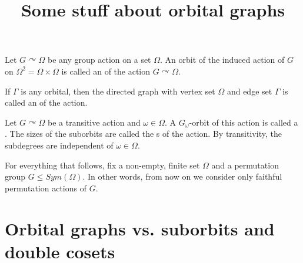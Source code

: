 \documentclass[fontsize=11pt,fleqn,a4paper]{scrartcl}
\title{Some stuff about orbital graphs}
\begin{document}
\maketitle

\begin{definition}
Let $G\curvearrowright\Omega$ be any group action on a set $\Omega$. An orbit of the induced action of $G$ on $\Omega^2=\Omega\times\Omega$ is called an  of the action $G \curvearrowright \Omega$.

If $\Gamma$ is any orbital, then the directed graph with vertex set $\Omega$ and edge set $\Gamma$ is called an  of the action.
\end{definition}

\begin{definition}
Let $G\curvearrowright\Omega$ be a transitive action and $\omega\in\Omega$. A $G_\omega$-orbit of this action is called a . The sizes of the suborbits are called the s of the action. By transitivity, the subdegrees are independent of $\omega\in\Omega$.
\end{definition}


\begin{convention}
For everything that follows, fix a non-empty, finite set $\Omega$ and a permutation group $G\leq Sym(\Omega)$. In other words, from now on we consider only faithful permutation actions of $G$.
\end{convention}


\section{Orbital graphs vs. suborbits and double cosets}
\end{document}
